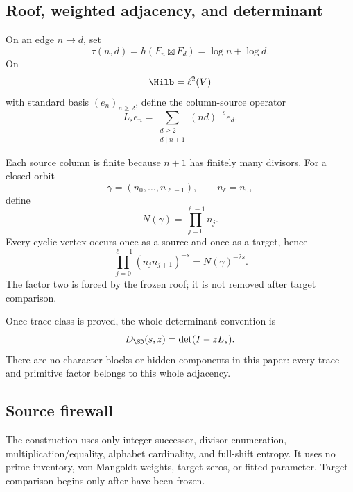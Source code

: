 \subsection{Roof, weighted adjacency, and determinant}

\begin{definition}
\label{def:operator}
On an edge \(n\to d\), set
\[
 \tau(n,d)=h(F_n\boxtimes F_d)=\log n+\log d.
\]
On
\[
 \Hilb=\ell^2(V)
\]
with standard basis \((e_n)_{n\ge2}\), define the column-source operator
\[
 L_se_n
 =
 \sum_{\substack{d\ge2\\d\mid n+1}}
 (nd)^{-s}e_d.
\]
\end{definition}

Each source column is finite because \(n+1\) has finitely many divisors.
For a closed orbit
\[
 \gamma=(n_0,\ldots,n_{\ell-1}),
 \qquad n_\ell=n_0,
\]
define
\[
 N(\gamma)=\prod_{j=0}^{\ell-1}n_j.
\]
Every cyclic vertex occurs once as a source and once as a target, hence
\begin{equation}
\label{eq:cyclic-weight}
\prod_{j=0}^{\ell-1}(n_jn_{j+1})^{-s}
=N(\gamma)^{-2s}.
\end{equation}
The factor two is forced by the frozen roof; it is not removed after target
comparison.

Once trace class is proved, the whole determinant convention is
\[
 D_{\SD}(s,z)=\det(I-zL_s).
\]
There are no character blocks or hidden components in this paper: every
trace and primitive factor belongs to this whole adjacency.

\subsection{Source firewall}

The construction uses only integer successor, divisor enumeration,
multiplication/equality, alphabet cardinality, and full-shift entropy.  It
uses no prime inventory, von Mangoldt weights, target zeros, or fitted
parameter.  Target comparison begins only after
 have been frozen.
